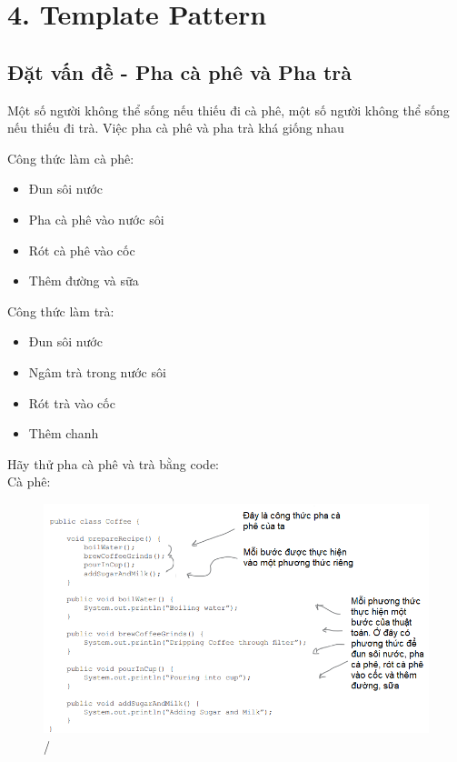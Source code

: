 \chapter{4. Template Pattern}
\section{Đặt vấn đề - Pha cà phê và Pha trà}
Một số người không thể sống nếu thiếu đi cà phê, một số người không thể sống nếu thiếu đi trà. Việc pha cà phê và pha trà khá giống nhau\smallskip

Công thức làm cà phê:
\begin{itemize}
\item Đun sôi nước
\item Pha cà phê vào nước sôi
\item Rót cà phê vào cốc
\item Thêm đường và sữa
\end{itemize}

Công thức làm trà:
\begin{itemize}
\item Đun sôi nước
\item Ngâm trà trong nước sôi
\item Rót trà vào cốc
\item Thêm chanh
\end{itemize}
Hãy thử pha cà phê và trà bằng code:\\[0.1in]
Cà phê:
\begin{figure}[!htb]
    \centering
    \includegraphics[width=\textwidth]{fig/Template/Coffee.png}/
\end{figure}\\[0.1in]

